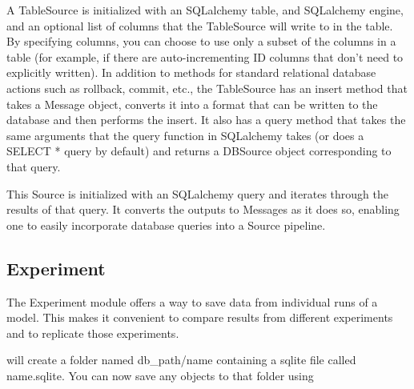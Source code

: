 \documentclass[letterpaper,10pt,english]{sphinxmanual}
\begin{document}
A TableSource is initialized with an SQLalchemy table, and SQLalchemy engine, and an optional list of columns that the TableSource will write
to in the table. By specifying columns, you can choose to use only a subset of the columns in a table (for example, if there are
auto-incrementing ID columns that don’t need to explicitly written).
In addition to methods for standard relational database actions such as rollback, commit, etc., the TableSource has an insert method that
takes a Message object, converts it into a format that can be written to the database and then performs the insert. It also has a query
method that takes the same arguments that the query function in SQLalchemy takes (or does a SELECT * query by default) and returns a DBSource
object corresponding to that query.


This Source is initialized with an SQLalchemy query and iterates through the results of that query. It converts the outputs to Messages as
it does so, enabling one to easily incorporate database queries into a Source pipeline.


\subsection{Experiment}
\label{\detokenize{Fireworks:experiment}}
The Experiment module offers a way to save data from individual runs of a model. This makes it convenient to compare results from different
experiments and to replicate those experiments.

\begin{sphinxVerbatim}[commandchars=\\\{\}]
    
\end{sphinxVerbatim}

will create a folder named db\_path/name containing a sqlite file called name.sqlite. You can now save any objects to that folder using

\begin{sphinxVerbatim}[commandchars=\\\{\}]
   
\end{sphinxVerbatim}
\end{document}
